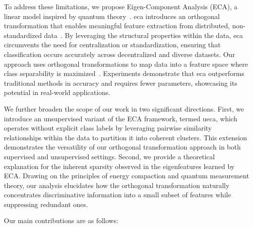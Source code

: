 \documentclass[lettersize,journal]{IEEEtran}
\begin{document}
To address these limitations, we propose Eigen-Component Analysis (ECA), a linear model inspired by quantum theory~\cite{tang2019quantum}. \Gls{eca} introduces an orthogonal transformation that enables meaningful feature extraction from distributed, non-standardized data~\cite{sanchez1996use,kanjilal1995application,yen1999simplifying}. By leveraging the structural properties within the data, \Gls{eca} circumvents the need for centralization or standardization, ensuring that classification occurs accurately across decentralized and diverse datasets. Our approach uses orthogonal transformations to map data into a feature space where class separability is maximized~\cite{sanchez1996use,kanjilal1995application}. Experiments demonstrate that \Gls{eca} outperforms traditional methods in accuracy and requires fewer parameters, showcasing its potential in real-world applications.

We further broaden the scope of our work in two significant directions. First, we introduce an unsupervised variant of the ECA framework, termed \Gls{ueca}, which operates without explicit class labels by leveraging pairwise similarity relationships within the data to partition it into coherent clusters. This extension demonstrates the versatility of our orthogonal transformation approach in both supervised and unsupervised settings. Second, we provide a theoretical explanation for the inherent sparsity observed in the eigenfeatures learned by ECA. Drawing on the principles of energy compaction and quantum measurement theory, our analysis elucidates how the orthogonal transformation naturally concentrates discriminative information into a small subset of features while suppressing redundant ones.


Our main contributions are as follows:
\end{document}
